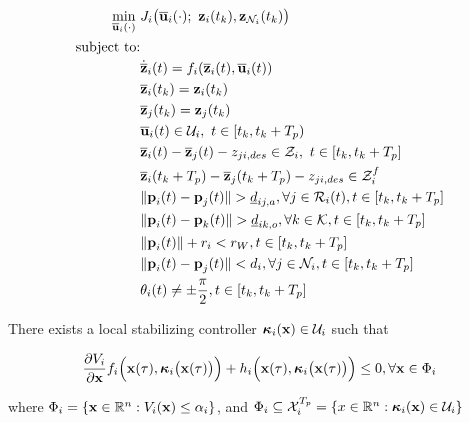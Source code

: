 \begin{align}
  \min\limits_{\overline{\bm{\mathbf{u}}}_i (\cdot)}\ &
    J_i \big(\overline{\bm{\mathbf{u}}}_i (\cdot);\ \bm{\mathbf{z}}_i(t_k), \bm{\mathbf{z}}_{\mathcal{N}_i}(t_k)\big) \\
  \text{subject to:} & \\
  & \dot{\overline{\bm{\mathbf{z}}}}_i(t) = f_i (\overline{\bm{\mathbf{z}}}_i (t), \overline{\bm{\mathbf{u}}}_i (t)) \\
  & \overline{\bm{\mathbf{z}}}_i (t_k) = \bm{\mathbf{z}}_i (t_k) \\
  & \overline{\bm{\mathbf{z}}}_j (t_k) = \bm{\mathbf{z}}_j (t_k) \\
  & \overline{\bm{\mathbf{u}}}_i(t) \in \mathcal{U}_i,\ t \in [t_k, t_k + T_p)\\
  & \overline{\bm{\mathbf{z}}}_i (t) - \overline{\bm{\mathbf{z}}}_j (t) - z_{ji, des} \in \mathcal{Z}_i,\ t \in [t_k, t_k + T_p]\\
  & \overline{\bm{\mathbf{z}}}_i (t_k + T_p) - \overline{\bm{\mathbf{z}}}_j (t_k + T_p) - z_{ji,des} \in \mathcal{Z}_i^f \\
  & \|\bm{\mathbf{p}}_i(t) - \bm{\mathbf{p}}_j(t)\| > \underline{d}_{ij,a}, \forall j \in \mathcal{R}_i(t), t \in [t_k, t_k + T_p] \\
  & \|\bm{\mathbf{p}}_i(t) - \bm{\mathbf{p}}_k(t)\| > \underline{d}_{ik,o}, \forall k \in \mathcal{K}, t \in [t_k, t_k + T_p] \\
  & \|\bm{\mathbf{p}}_i(t)\| + r_i < r_W, t \in [t_k, t_k + T_p] \\
  & \|\bm{\mathbf{p}}_i(t) - \bm{\mathbf{p}}_j(t)\| < d_i, \forall j \in \mathcal{N}_i, t \in [t_k, t_k + T_p] \\
  & \theta_i(t) \ne \pm \frac{\pi}{2}, t \in [t_k, t_k + T_p]
\end{align}

\begin{gg_box}
\begin{assumption}

  There exists a local stabilizing controller
  $\bm{\mathbf{\kappa}}_i(\bm{\mathbf{x}}) \in \mathcal{U}_i$ such that

  \begin{align}
    \dfrac{\partial V_i}{\partial \bm{\mathbf{x}}} f_i \Big(\bm{\mathbf{x}}(\tau), \bm{\mathbf{\kappa}}_i\big(\bm{\mathbf{x}}(\tau)\big)\Big) +
      h_i\Big(\bm{\mathbf{x}}(\tau), \bm{\mathbf{\kappa}}_i \big(\bm{\mathbf{x}}(\tau)\big)\Big) \leq 0, \forall \bm{\mathbf{x}} \in \Phi_i
  \end{align}

  where $\Phi_i = \{\bm{\mathbf{x}} \in \mathbb{R}^n : V_i(\bm{\mathbf{x}}) \leq \alpha_i \}$, and
  $\Phi_i \subseteq \mathcal{X}_i^{T_p} = \{x \in \mathbb{R}^n : \bm{\mathbf{\kappa}}_i(\bm{\mathbf{x}}) \in \mathcal{U}_i\}$

  \label{ass:local_controller_k}
\end{assumption}
\end{gg_box}


